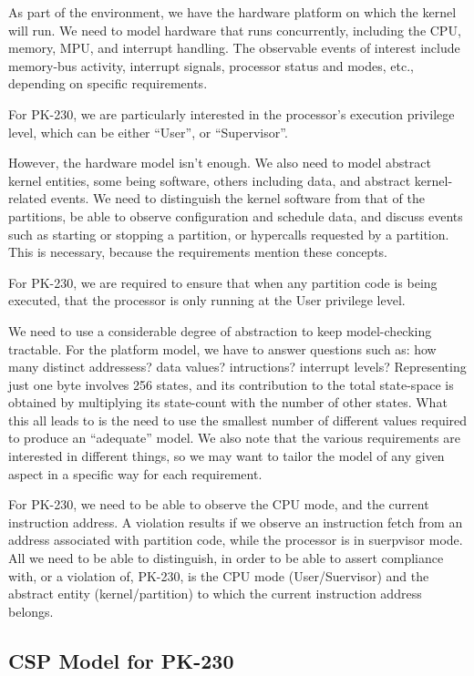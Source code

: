 As part of the environment,
we have the hardware platform on which the kernel will run.
We need to model hardware that runs concurrently,
including the CPU, memory, MPU, and interrupt handling.
The observable events of interest include memory-bus activity,
interrupt signals, processor status and modes, etc.,
depending on specific requirements.

For PK-230, we are particularly interested in the processor's
execution privilege level,
which can be either ``User'', or ``Supervisor''.

However, the hardware model isn't enough.
We also need to model abstract kernel entities, some being software,
others including data, and abstract kernel-related events.
We need to distinguish the kernel software from that of the partitions,
be able to observe configuration and schedule data,
and discuss events such as starting or stopping a partition,
or hypercalls requested by a partition.
This is necessary, because the requirements mention these concepts.

For PK-230, we are required to ensure that when any partition code
is being executed, that the processor is only running at the User
privilege level.

We need to use a considerable degree of abstraction
to keep model-checking tractable.
For the platform model, we have to answer questions such as:
how many distinct addressess? data values? intructions? interrupt levels?
Representing just one byte involves 256 states,
and its contribution to the total state-space is obtained by multiplying
its state-count with the number of other states.
What this all leads to is the need to use the smallest number of different
values required to produce an ``adequate'' model.
We also note that the various requirements are interested in different
things, so we may want to tailor the model of any given aspect
in a specific way for each requirement.

For PK-230, we need to be able to observe the CPU mode,
and the current instruction address.
A violation results if we observe an instruction fetch from an address
associated with partition code, while the processor is in suerpvisor mode.
All we need to be able to distinguish,
in order to be able to assert compliance with, or a violation of, PK-230,
is the CPU mode (User/Suervisor) and the abstract entity (kernel/partition)
to which the current instruction address belongs.

\subsection{CSP Model for PK-230}

